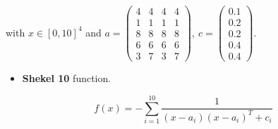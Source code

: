 \documentclass[symmetry,article,submit,moreauthors,pdftex]{mdpi}
\begin{document}
with $x\in[0,10]^{4}$ and $a=\left(\begin{array}{cccc}
4 & 4 & 4 & 4\\
1 & 1 & 1 & 1\\
8 & 8 & 8 & 8\\
6 & 6 & 6 & 6\\
3 & 7 & 3 & 7
\end{array}\right),\ c=\left(\begin{array}{c}
0.1\\
0.2\\
0.2\\
0.4\\
0.4
\end{array}\right)$.
\begin{itemize}
\item \textbf{Shekel 10} function.
\end{itemize}
\[
f(x)=-\sum_{i=1}^{10}\frac{1}{(x-a_{i})(x-a_{i})^{T}+c_{i}}
\]
 
\end{document}
